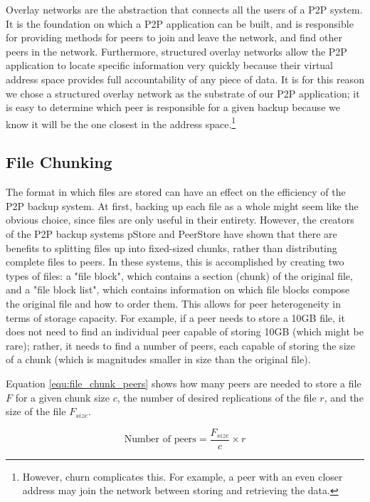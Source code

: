 \documentclass[12pt]{report}
\begin{document}
Overlay networks are the abstraction that connects all the users of a P2P system. It is the foundation on which a P2P application can be built, and is responsible for providing methods for peers to join and leave the network, and find other peers in the network. Furthermore, structured overlay networks allow the P2P application to locate specific information very quickly because their virtual address space provides full accountability of any piece of data. It is for this reason we chose a structured overlay network as the substrate of our P2P application; it is easy to determine which peer is responsible for a given backup because we know it will be the one closest in the address space.\footnote{However, churn complicates this. For example, a peer with an even closer address may join the network between storing and retrieving the data.}


\subsection{File Chunking} \label{sec:filechunking}
The format in which files are stored can have an effect on the efficiency of the P2P backup system. At first, backing up each file as a whole might seem like the obvious choice, since files are only useful in their entirety. However, the creators of the P2P backup systems pStore \cite{pStore} and PeerStore \cite{PeerStore} have shown that there are benefits to splitting files up into fixed-sized chunks, rather than distributing complete files to peers. In these systems, this is accomplished by creating two types of files: a "file block", which contains a section (chunk) of the original file, and a "file block list", which contains information on which file blocks compose the original file and how to order them. This allows for peer heterogeneity in terms of storage capacity. For example, if a peer needs to store a 10GB file, it does not need to find an individual peer capable of storing 10GB (which might be rare); rather, it needs to find a number of peers, each capable of storing the size of a chunk (which is magnitudes smaller in size than the original file).

Equation \ref{equ:file_chunk_peers} shows how many peers are needed to store a file $F$ for a given chunk size $c$, the number of desired replications of the file $r$, and the size of the file $F_{size}$.

\begin{equation} \label{equ:file_chunk_peers}
\text{Number of peers} = \frac{F_{size}}{c} \times r
\end{equation}
\end{document}

